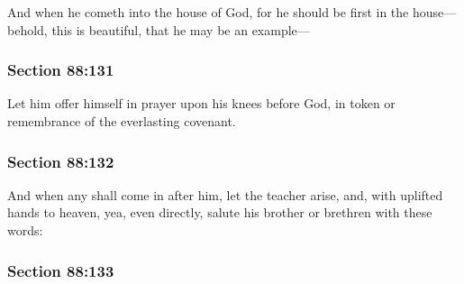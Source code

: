		And when he cometh into the house of God, for he should be first in the house---behold, this is beautiful, that he may be an example---


	\subsubsection{Section 88:131} %
		\label{DC88-131}

		Let him offer himself in prayer upon his knees before God, in token or remembrance of the everlasting covenant.


	\subsubsection{Section 88:132} %
		\label{DC88-132}

		And when any shall come in after him, let the teacher arise, and, with uplifted hands to heaven, yea, even directly, salute his brother or brethren with these words:


	\subsubsection{Section 88:133} %
		\label{DC88-133}

